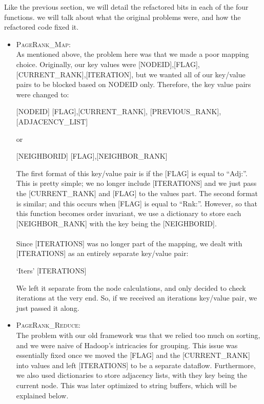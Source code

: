 \documentclass{article}
\begin{document}
Like the previous section, we will detail the refactored bits in each of the four functions. we will talk about what the original problems were, and how the refactored code fixed it.
\begin{itemize}
  \item \textsc{PageRank\_Map}: \\
    As mentioned above, the problem here was that we made a poor mapping choice. Originally, our key values were [NODEID],[FLAG],[CURRENT\_RANK],[ITERATION], but we wanted all of our key/value pairs to be blocked based on NODEID only. Therefore, the key value pairs were changed to:
    \begin{center}
      [NODEID] \hspace{8mm} [FLAG],[CURRENT\_RANK], [PREVIOUS\_RANK], [ADJACENCY\_LIST]
    \end{center}
    or
    \begin{center}
      [NEIGHBORID] \hspace{8mm} [FLAG],[NEIGHBOR\_RANK]
    \end{center}
    The first format of this key/value pair is if the [FLAG] is equal to ``Adj:''. This is pretty simple; we no longer include [ITERATIONS] and we just pass the [CURRENT\_RANK] and [FLAG] to the values part. The second format is similar; and this occurs when [FLAG] is equal to ``Rnk:''. However, so that this function becomes order invariant, we use a dictionary to store each [NEIGHBOR\_RANK] with the key being the [NEIGHBORID].
    \\ \\
    Since [ITERATIONS] was no longer part of the mapping, we dealt with [ITERATIONS] as an entirely separate key/value pair: 
    \begin{center}
      `Iters' \hspace{8mm} [ITERATIONS]
    \end{center} 
    We left it separate from the node calculations, and only decided to check iterations at the very end. So, if we received an iterations key/value pair, we just passed it along.
  \item \textsc{PageRank\_Reduce}: \\
    The problem with our old framework was that we relied too much on sorting, and we were naive of Hadoop's intricacies for grouping. This issue was essentially fixed once we moved the [FLAG] and the [CURRENT\_RANK] into values and left [ITERATIONS] to be a separate dataflow. Furthermore, we also used dictionaries to store adjacency lists, with they key being the current node. This was later optimized to string buffers, which will be explained below.

\end{itemize}
\end{document}

